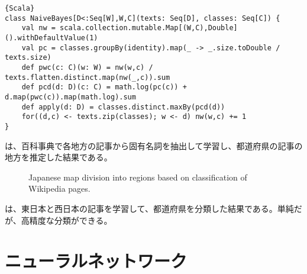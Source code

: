 \documentclass[10pt,a4paper]{book}
\begin{document}
\begin{Verbatim}{Scala}
class NaiveBayes[D<:Seq[W],W,C](texts: Seq[D], classes: Seq[C]) {
	val nw = scala.collection.mutable.Map[(W,C),Double]().withDefaultValue(1)
	val pc = classes.groupBy(identity).map(_ -> _.size.toDouble / texts.size)
	def pwc(c: C)(w: W) = nw(w,c) / texts.flatten.distinct.map(nw(_,c)).sum
	def pcd(d: D)(c: C) = math.log(pc(c)) + d.map(pwc(c)).map(math.log).sum
	def apply(d: D) = classes.distinct.maxBy(pcd(d))
	for((d,c) <- texts.zip(classes); w <- d) nw(w,c) += 1
}
\end{Verbatim}

は、百科事典で各地方の記事から固有名詞を抽出して学習し、都道府県の記事の地方を推定した結果である。

\begin{figure}[h]
\centering
{}
\caption{Japanese map division into regions based on classification of Wikipedia pages.\label{fig:nbc:jmap}}
\end{figure}

は、東日本と西日本の記事を学習して、都道府県を分類した結果である。単純だが、高精度な分類ができる。

\chapter{ニューラルネットワーク\label{chap:nn}}
\end{document}
